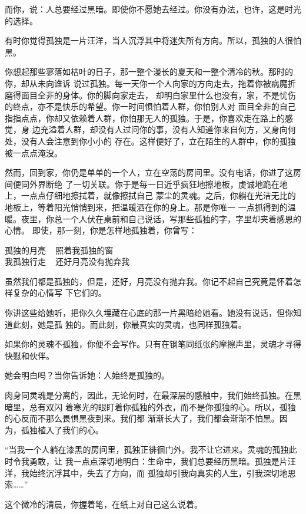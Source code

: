 		而你，说：人总要经过黑暗。即使你不愿她去经过。你没有办法，也许，这是时光的选择。

		有时你觉得孤独是一片汪洋，当人沉浮其中将迷失所有方向。所以，孤独的人很怕黑。

		你想起那些寥落如枯叶的日子，那一整个漫长的夏天和一整个清冷的秋。那时的你，却从未向谁诉
	说过孤独。每一天你一个人向家的方向走去，拖着你被病魔折磨得面目全非的身体。你的脚向家走去，
	却明白家里什么也没有，家，不是忧伤的终点，亦不是快乐的希望。你一时间惧怕着人群，你怕别人对
	面目全非的自己指指点点，你却又依赖着人群，你怕那无人的孤独。于是，你喜欢走在路上的感觉，身
	边充溢着人群，却没有人过问你的事，没有人知道你来自何方，又身向何处，没有人会注意到你小小的
	存在。这样便好了，立在陌生的人群中，你的孤独被一点点淹没。

		然而，回到家，你仍是单单的一个人，立在空荡的房间里。没有电话，你进了这房间便同外界断绝
	了一切关联。你于是每一日近乎疯狂地擦地板，虔诚地跪在地上，一点点仔细地擦拭着，就像擦拭自己
	蒙尘的灵魂。之后，你躺在光洁无比的地板上，等着阳光悄悄到来，把温暖洒在你的身上。那是你唯一
	一点抓得到的温暖。夜里，你总一个人伏在桌前和自己说话，写那些孤独的字，字里却夹着感恩的心情。
	即使，那一刻，你是怎样地孤独着，你曾写：

		\longpoem{}{}{}
			孤独的月亮 ~ 照着我孤独的窗 \\
			我孤独行走 ~ 还好月亮没有抛弃我
		\endlongpoem

		虽然我们都是孤独的，但是，还好，月亮没有抛弃我。你记不起自己究竟是怀着怎样复杂的心情写
	下它们的。

		你讲这些给她听，把你久久埋藏在心底的那一片黑暗给她看。她没有说话，但你知道此刻，她是孤
	独的。而此刻，你最真实的灵魂，也同样孤独着。

		如果你的灵魂不孤独，你便不会写作。只有在钢笔同纸张的摩擦声里，灵魂才寻得快慰和伙伴。

		她会明白吗？当你告诉她：人始终是孤独的。

		肉身同灵魂是分离的，因此，无论何时，在最深层的感触中，我们始终孤独。在黑暗里，总有双闪
	着寒光的眼盯着你孤独的外衣，而不是你孤独的心。所以，孤独的心反而不那么畏惧黑夜到来。我们都
	渐渐长大了，我们都会渐渐不怕黑。因为，孤独植入了我们的心。

		“当我一个人躺在漆黑的房间里，孤独正徘徊门外。我不让它进来。灵魂的孤独此时令我勇敢，让
	我一点点深切地明白：生命中，我们总要经历黑暗。孤独是片汪洋，我始终沉浮其中，失去了方向，而
	孤独却引我向真实的人生，引我深切地思索……”

		这个微冷的清晨，你握着笔，在纸上对自己这么说着。

